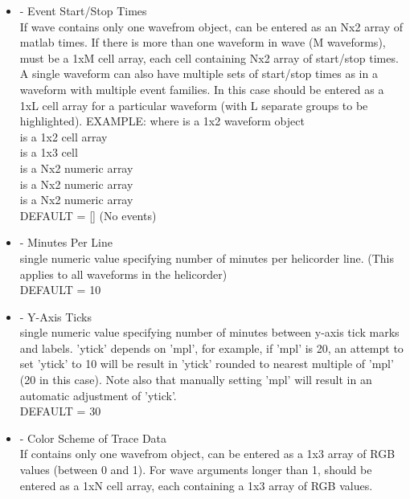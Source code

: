 \documentclass[11pt]{article}
\begin{document}
\begin{itemize}
\item {} - Event Start/Stop Times \\
If wave contains only one wavefrom object,  can be entered as an Nx2 array of matlab times. If there is more than one waveform in wave (M waveforms),  must be a 1xM cell array, each cell containing Nx2 array of start/stop times. A single waveform can also have multiple sets of start/stop times as in a waveform with multiple event families. In this case  should be entered as a 1xL cell array for a particular waveform (with L separate groups to be highlighted).
EXAMPLE:  where  is a 1x2 waveform object \\
 is a 1x2 cell array \\
 is a 1x3 cell \\
 is a Nx2 numeric array \\
 is a Nx2 numeric array \\
 is a Nx2 numeric array \\
DEFAULT = [] (No events)

\item {} - Minutes Per Line \\
single numeric value specifying number of minutes per helicorder line. (This applies to all waveforms in the helicorder)\\
DEFAULT = 10 

\item {} - Y-Axis Ticks \\
single numeric value specifying number of minutes between y-axis tick marks and labels. 'ytick' depends on 'mpl', for example, if 'mpl' is 20, an attempt to set 'ytick' to 10 will be result in 'ytick' rounded to nearest multiple of 'mpl' (20 in this case). Note also that manually setting 'mpl' will result in an automatic adjustment of 'ytick'.\\
DEFAULT = 30

\item {} - Color Scheme of Trace Data\\
If  contains only one wavefrom object,  can be entered as a 1x3 array of RGB values (between 0 and 1). For wave arguments longer than 1,  should be entered as a 1xN cell array, each containing a 1x3 array of RGB values.


\end{itemize}
\end{document}
